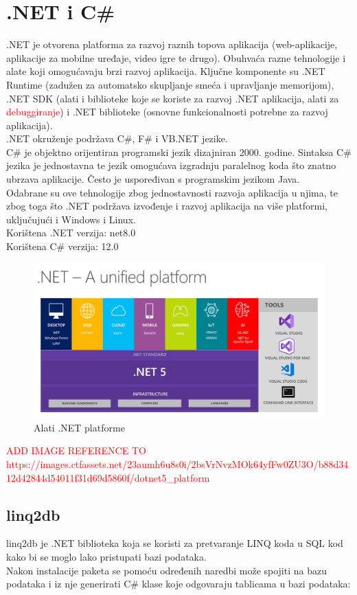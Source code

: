 \documentclass[zavrsnirad]{fer}
\begin{document}
\section{.NET i C\#}
.NET je otvorena platforma za razvoj raznih topova aplikacija (web-aplikacije, aplikacije za mobilne uređaje, video igre te drugo). Obuhvaća razne tehnologije i alate koji omogućavaju brzi razvoj aplikacija. Ključne komponente su .NET Runtime (zadužen za automatsko skupljanje smeća i upravljanje memorijom), .NET SDK (alati i biblioteke koje se koriste za razvoj .NET aplikacija, alati za \textcolor{red}{debuggiranje}) i .NET biblioteke (osnovne funkcionalnosti potrebne za razvoj aplikacija).
\\.NET okruženje podržava C\#, F\# i VB.NET jezike.
\\C\# je objektno orijentiran programski jezik dizajniran 2000. godine. Sintaksa C\# jezika je jednostavna te jezik omogućava izgradnju paralelnog koda što znatno ubrzava aplikacije. Često je uspoređivan s programskim jezikom Java.
\\Odabrane su ove tehnologije zbog jednostavnosti razvoja aplikacija u njima, te zbog toga što .NET podržava izvođenje i razvoj aplikacija na više platformi, uključujući i Windows i Linux.
\\Korištena .NET verzija: net8.0\\Korištena C\# verzija: 12.0
\begin{figure}[htb]
	\centering
	\includegraphics[trim={0 0 15cm 5cm},clip,width=1\linewidth]{images/dotnet5_platform.png} 
	\caption{Alati .NET platforme}
	\label{slk:dotnet}
\end{figure}
\FloatBarrier
\textcolor{red}{ADD IMAGE REFERENCE TO https://images.ctfassets.net/23aumh6u8s0i/2bsVrNvzMOk64yfFw0ZU3O/b88d3412d42844d54011f31d69d5860f/dotnet5\_platform}

\subsection{linq2db}
\label{pog:linq2db}
linq2db je .NET biblioteka koja se koristi za pretvaranje LINQ koda u SQL kod kako bi se moglo lako pristupati bazi podataka.
\\Nakon instalacije paketa se pomoću određenih naredbi može spojiti na bazu podataka i iz nje generirati C\# klase koje odgovaraju tablicama u bazi podataka:
\end{document}
